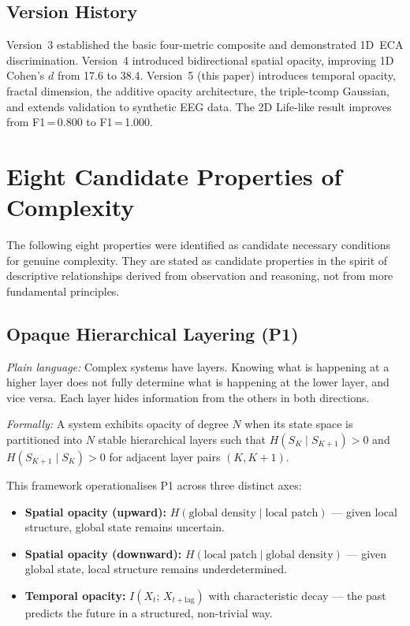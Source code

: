 \documentclass[12pt,a4paper]{article}
\begin{document}
\subsection*{Version History}

Version~3 established the basic four-metric composite and demonstrated
1D~ECA discrimination.
Version~4 introduced bidirectional spatial opacity, improving 1D
Cohen's $d$ from 17.6 to 38.4.
Version~5 (this paper) introduces temporal opacity, fractal dimension,
the additive opacity architecture, the triple-tcomp Gaussian, and
extends validation to synthetic EEG data.
The 2D Life-like result improves from F1\,=\,0.800 to F1\,=\,1.000.

\section{Eight Candidate Properties of Complexity}

The following eight properties were identified as candidate necessary
conditions for genuine complexity.
They are stated as candidate properties in the spirit of descriptive
relationships derived from observation and reasoning, not from more
fundamental principles.

\subsection{Opaque Hierarchical Layering (P1)}

\textit{Plain language:} Complex systems have layers.
Knowing what is happening at a higher layer does not fully determine
what is happening at the lower layer, and vice versa.
Each layer hides information from the others in both directions.

\textit{Formally:} A system exhibits opacity of degree $N$ when its
state space is partitioned into $N$ stable hierarchical layers such
that $H(S_K \mid S_{K+1}) > 0$ and $H(S_{K+1} \mid S_K) > 0$ for
adjacent layer pairs $(K, K+1)$.

This framework operationalises P1 across three distinct axes:
\begin{itemize}[noitemsep]
  \item \textbf{Spatial opacity (upward):}
    $H(\text{global density} \mid \text{local patch})$ --- given local
    structure, global state remains uncertain.
  \item \textbf{Spatial opacity (downward):}
    $H(\text{local patch} \mid \text{global density})$ --- given
    global state, local structure remains underdetermined.
  \item \textbf{Temporal opacity:}
    $I(X_t;\,X_{t+\text{lag}})$ with characteristic decay --- the past
    predicts the future in a structured, non-trivial way.
\end{itemize}
\end{document}
